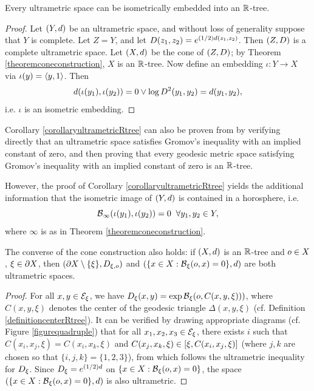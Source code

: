 \begin{corollary}
\label{corollaryultrametricRtree}
Every ultrametric space can be isometrically embedded into an $\R$-tree.
\end{corollary}
\begin{proof}
Let $(Y,d)$ be an ultrametric space, and without loss of generality suppose that $Y$ is complete. Let $Z = Y$, and let $D(z_1,z_2) = e^{(1/2)d(z_1,z_2)}$. Then $(Z,D)$ is a complete ultrametric space. Let $(X,d)$ be the cone of $(Z,D)$; by Theorem \ref{theoremconeconstruction}, $X$ is an $\R$-tree. Now define an embedding $\iota:Y\to X$ via $\iota(y) = \langle y,1\rangle$. Then
\[
d(\iota(y_1),\iota(y_2)) = 0\vee \log D^2(y_1,y_2) = d(y_1,y_2),
\]
i.e. $\iota$ is an isometric embedding.
\end{proof}

\begin{remark}
Corollary \ref{corollaryultrametricRtree} can also be proven from \cite[Theorem 4.1]{BonkSchramm} by verifying directly that an ultrametric space satisfies Gromov's inequality with an implied constant of zero, and then proving that every geodesic metric space satisfying Gromov's inequality with an implied constant of zero is an $\R$-tree.

However, the proof of Corollary \ref{corollaryultrametricRtree} yields the additional information that the isometric image of $(Y,d)$ is contained in a horosphere, i.e.
\begin{equation}
\label{ultrametrichorosphere}
\operatorname{\mathcal B}_\infty(\iota(y_1),\iota(y_2)) = 0 \;\;\forall y_1,y_2\in Y,
\end{equation}
where $\infty$ is as in Theorem \ref{theoremconeconstruction}.
\end{remark}

\begin{remark}
\label{remarkconverseultrametric}
The converse of the cone construction also holds: if $(X,d)$ is an $\R$-tree and $o\in X$, $\xi\in\partial X$, then $(\partial X\setminus\{\xi\},D_{\xi,o})$ and $(\{x\in X: \operatorname{\mathcal B}_\xi(o,x) = 0\},d)$ are both ultrametric spaces.
\end{remark}
\begin{proof}
For all $x,y\in\mathcal E_\xi$, we have $D_\xi(x,y) = \exp\operatorname{\mathcal B}_\xi(o,C(x,y,\xi)))$, where $C(x,y,\xi)$ denotes the center of the geodesic triangle $\Delta(x,y,\xi)$ (cf. Definition \ref{definitioncenterRtree}). It can be verified by drawing appropriate diagrams (cf. Figure \ref{figurequadruple}) that for all $x_1,x_2,x_3\in\mathcal E_\xi$, there exists $i$ such that $C(x_i,x_j,\xi) = C(x_i,x_k,\xi)$ and $C(x_j,x_k,\xi) \in [\xi,C(x_i,x_j,\xi)]$ (where $j,k$ are chosen so that $\{i,j,k\} = \{1,2,3\}$), from which follows the ultrametric inequality for $D_\xi$. Since $D_\xi = e^{(1/2)d}$ on $\{x\in X: \operatorname{\mathcal B}_\xi(o,x) = 0\}$, the space $(\{x\in X: \operatorname{\mathcal B}_\xi(o,x) = 0\},d)$ is also ultrametric.
\end{proof}




